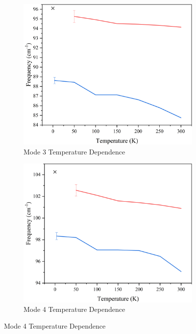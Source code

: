 \begin{figure}
\begin{subfigure}{0.45\textwidth}
\centering
\includegraphics[width=\textwidth]{Figures/Misc/QHA/Mode3CompV2G.png}
\caption{Mode 3 Temperature Dependence}
\label{fig:mode3temp}
\end{subfigure}
\begin{subfigure}{0.45\textwidth}
\centering
\includegraphics[width=\textwidth]{Figures/Misc/QHA/Mode4CompV2G.png}
\caption{Mode 4 Temperature Dependence}
\label{fig:mode4temp}
\end{subfigure}


\end{figure}
